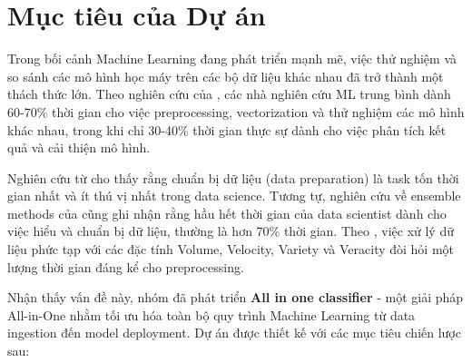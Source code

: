 \section{Mục tiêu của Dự án}

\noindent
Trong bối cảnh Machine Learning đang phát triển mạnh mẽ, việc thử nghiệm và so sánh các mô hình học máy trên các bộ dữ liệu khác nhau đã trở thành một thách thức lớn. Theo nghiên cứu của \cite{domingos2012}, các nhà nghiên cứu ML trung bình dành 60-70\% thời gian cho việc preprocessing, vectorization và thử nghiệm các mô hình khác nhau, trong khi chỉ 30-40\% thời gian thực sự dành cho việc phân tích kết quả và cải thiện mô hình.

\vspace{1em}
\noindent
Nghiên cứu từ \cite{domingos2012} cho thấy rằng chuẩn bị dữ liệu (data preparation) là task tốn thời gian nhất và ít thú vị nhất trong data science. Tương tự, nghiên cứu về ensemble methods của \cite{maclin2011} cũng ghi nhận rằng hầu hết thời gian của data scientist dành cho việc hiểu và chuẩn bị dữ liệu, thường là hơn 70\% thời gian. Theo \cite{cover1967}, việc xử lý dữ liệu phức tạp với các đặc tính Volume, Velocity, Variety và Veracity đòi hỏi một lượng thời gian đáng kể cho preprocessing.

\vspace{1em}
\noindent
Nhận thấy vấn đề này, nhóm đã phát triển \textbf{All in one classifier} - một giải pháp All-in-One nhằm tối ưu hóa toàn bộ quy trình Machine Learning từ data ingestion đến model deployment. Dự án được thiết kế với các mục tiêu chiến lược sau:

